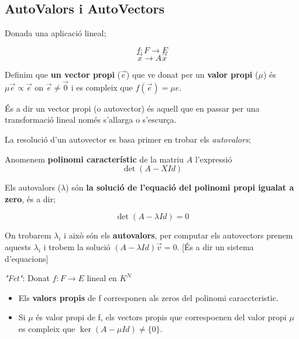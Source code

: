 \documentclass[12pt]{article}
\begin{document}
\subsection{AutoValors i AutoVectors}

Donada una aplicació lineal;

\[f: F \rightarrow E\]
\[\vec{x} \rightarrow A \vec{x}\]

Definim que \textbf{un vector propi} ($\vec{e}$) que ve donat per un \textbf{valor propi} ($\mu$) és $\mu\vec{e} \propto \vec{e}$ on $\vec{e} \neq \vec{0}$ i es compleix que $f(\vec{e}) = \mu e$. 

És a dir un vector propi (o autovector) és aquell que en passar per una transformació lineal només s'allarga o s'escurça.

La resolució d'un autovector es basa primer en trobar els \textit{autovalors};

Anomenem \textbf{polinomi característic} de la matriu $A$ l'expressió
\[\boxed{\det(A - XId)}\]

Els autovalors ($\lambda$) són \textbf{la solució de l'equació del polinomi propi igualat a zero}, és a dir;

\[\boxed{\det(A-\lambda Id)=0}\]

On trobarem $\lambda_i$ i això són els \textbf{autovalors}, per computar els autovectors prenem aquests $\lambda_i$ i trobem la solució $(A - \lambda Id) \vec{v} = 0$. [És a dir un sistema d'equacions]

\noindent\textit{"Fet"}: Donat $f: F \rightarrow E$ lineal en $K^N$

\begin{itemize}
    \item Els \textbf{valors propis} de f corresponen als zeros del polinomi caraccteristic.
    \item Si $\mu$ és valor propi de f, els vectors propis que correspoenen del valor propi $\mu$ es compleix que $\boxed{\ker(A - \mu Id) \neq \{0\}}$.
\end{itemize}
\end{document}
